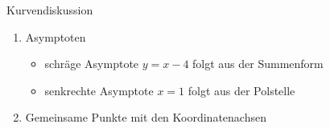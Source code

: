 \begin{bsp}{Kurvendiskussion}{}
\begin{enumerate}
 \begin{enumerate}
     \item Verhalten für $x\longrightarrow \infty$
      \begin{equation*}
    \begin{split}
        \lim_{x\longrightarrow \infty} f(x) &= \lim_{x\longrightarrow \infty} \dfrac{x^3-6x^2+9x}{(x-1)^2} \\
         &= \lim_{x\longrightarrow \infty}  x-4+\dfrac{4}{(x-1)^2}\\
         &= \infty
    \end{split}
\end{equation*}
 \item Verhalten für $x\longrightarrow -\infty$
      \begin{equation*}
    \begin{split}
        \lim_{x\longrightarrow -\infty} f(x) &= \lim_{x\longrightarrow -\infty} \dfrac{x^3-6x^2+9x}{(x-1)^2} \\
         &= \lim_{x\longrightarrow -\infty}  x-4+\dfrac{4}{(x-1)^2}\\
         &= -\infty
    \end{split}
\end{equation*}
\item Verhalten an der Definitionslücke
      \begin{equation*}
    \begin{split}
        \lim_{x\longrightarrow 1^-} f(x) &= \lim_{x\longrightarrow 1^-} \dfrac{x^3-6x^2+9x}{(x-1)^2} \\
         &= \infty\\
         \lim_{x\longrightarrow 1^+} f(x) &= \lim_{x\longrightarrow 1^+} \dfrac{x^3-6x^2+9x}{(x-1)^2} \\
         &= \infty
    \end{split}
\end{equation*}
Daraus folgt, dass an der Stelle $x=1$ eine Polstelle (Unendlichkeitsstelle) ohne Vorzeichenwechsel (VZW) vorliegt.
 \end{enumerate}
 \item Asymptoten
 \begin{itemize}
     \item schräge Asymptote $y= x-4$ folgt aus der Summenform
     \item senkrechte Asymptote $x=1$ folgt aus der Polstelle
 \end{itemize}
 \item Gemeinsame Punkte mit den Koordinatenachsen
 \begin{equation*}

\end{equation*}
\end{enumerate}
\end{bsp}
